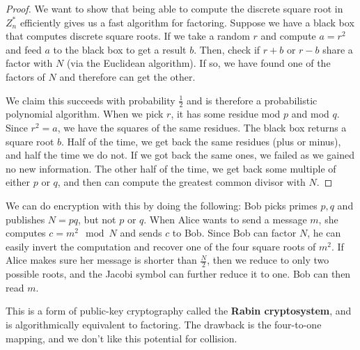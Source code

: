\begin{proof}
	We want to show that being able to compute the discrete square root in $Z_n^*$ efficiently gives us a fast algorithm for factoring.  Suppose we have a black box that computes discrete square roots.  If we take a random $r$ and compute $a=r^2$ and feed $a$ to the black box to get a result $b$.  Then, check if $r+b$ or $r-b$ share a factor with $N$ (via the Euclidean algorithm).  If so, we have found one of the factors of $N$ and therefore can get the other.
	
	We claim this succeeds with probability $\frac{1}{2}$ and is therefore a probabilistic polynomial algorithm.  When we pick $r$, it has some residue mod $p$ and mod $q$.  Since $r^2=a$, we have the squares of the same residues.  The black box returns a square root $b$.  Half of the time, we get back the same residues (plus or minus), and half the time we do not.  If we got back the same ones, we failed as we gained no new information.  The other half of the time, we get back some multiple of either $p$ or $q$, and then can compute the greatest common divisor with $N$.
\end{proof}

We can do encryption with this by doing the following: Bob picks primes $p,q$ and publishes $N=pq$, but not $p$ or $q$.  When Alice wants to send a message $m$, she computes $c=m^2\mod N$ and sends $c$ to Bob.  Since Bob can factor $N$, he can easily invert the computation and recover one of the four square roots of $m^2$.  If Alice makes sure her message is shorter than $\frac{N}{2}$, then we reduce to only two possible roots, and the Jacobi symbol can further reduce it to one.  Bob can then read $m$.

This is a form of public-key cryptography called the \textbf{Rabin cryptosystem}, and is algorithmically equivalent to factoring.  The drawback is the four-to-one mapping, and we don't like this potential for collision.




 





